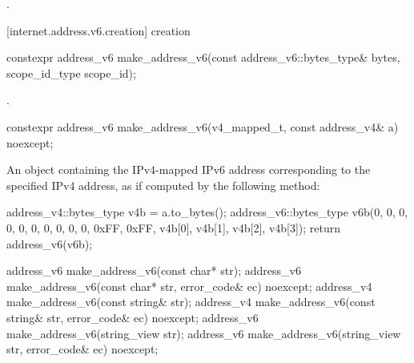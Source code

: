 \begin{itemdescr}
\pnum
\returns {}.
\end{itemdescr}



%
[internet.address.v6.creation]{ creation}

\begin{itemdecl}
constexpr address_v6 make_address_v6(const address_v6::bytes_type& bytes,
                                     scope_id_type scope_id);
\end{itemdecl}

\begin{itemdescr}
\pnum
\returns {}.
\end{itemdescr}

\begin{itemdecl}
constexpr address_v6 make_address_v6(v4_mapped_t, const address_v4& a) noexcept;
\end{itemdecl}

\begin{itemdescr}
\pnum
\returns An  object containing the IPv4-mapped IPv6 address corresponding to the specified IPv4 address, as if computed by the following method: 
\begin{codeblock}
address_v4::bytes_type v4b = a.to_bytes();
address_v6::bytes_type v6b(0, 0, 0, 0, 0, 0, 0, 0, 0, 0,
                           0xFF, 0xFF, v4b[0], v4b[1], v4b[2], v4b[3]);
return address_v6(v6b);
\end{codeblock}

\end{itemdescr}

\begin{itemdecl}
address_v6 make_address_v6(const char* str);
address_v6 make_address_v6(const char* str, error_code& ec) noexcept;
address_v4 make_address_v6(const string& str);
address_v4 make_address_v6(const string& str, error_code& ec) noexcept;
address_v6 make_address_v6(string_view str);
address_v6 make_address_v6(string_view str, error_code& ec) noexcept;
\end{itemdecl}

